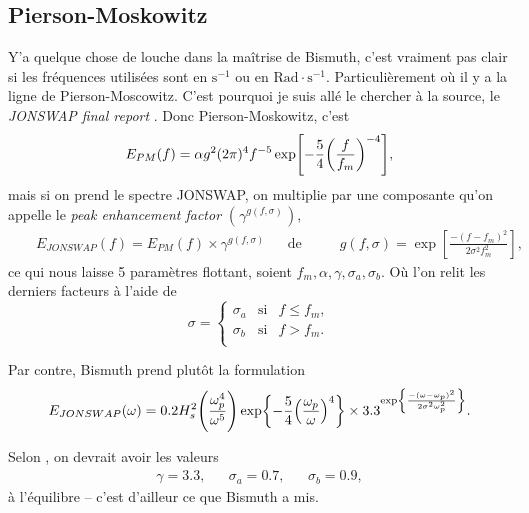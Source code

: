 \documentclass[10pt]{article}
\numberwithin{equation}{section}
\newcommand{\pt}{\hspace{1pt}} %
\begin{document}
\subsection{Pierson-Moskowitz}
\label{sec:orgaccf29c}

Y'a quelque chose de louche dans la maîtrise de Bismuth, c'est vraiment pas clair si les fréquences utilisées sont en \(\mathrm{s}^{-1}\) ou en \(\mathrm{Rad}\cdot\mathrm{s}^{-1}\).
Particulièrement où il y a la ligne de Pierson-Moscowitz.
C'est pourquoi je suis allé le chercher à la source, le \emph{JONSWAP final report} \autocite{hasselmann1973measurements}.
Donc Pierson-Moskowitz, c'est
\begin{equation}
   E_{PM}(f) = \alpha g^2 (2\pi)^4 f^{-5} \exp[- \frac{5}{4} \qty(\frac{f}{f_m})^{-4}],
\end{equation}
mais si on prend le spectre JONSWAP, on multiplie par une composante qu'on appelle le \emph{peak enhancement factor} \(\left(\pt\gamma^{g(f,\sigma)}\pt\right)\),
\begin{align}
   && E_{JONSWAP}(f) = E_{PM}(f)\times\gamma^{g(f,\sigma)}
   && \text{de sorte que} 
   && g(f,\sigma) = \exp[ \frac{-(f-f_m)^2}{2\sigma^2f_m^2}], &&
\end{align}
ce qui nous laisse 5 paramètres flottant, soient \(f_m, \alpha, \gamma, \sigma_a, \sigma_b\).
Où l'on relit les derniers facteurs à l'aide de
\begin{equation}
   \sigma = \left\lbrace\begin{matrix}
       \sigma_a & \mathrm{si} & f \leq f_m,\\
       \sigma_b & \mathrm{si} & f > f_m.\\
   \end{matrix}
  \right.
\end{equation}

Par contre, Bismuth prend plutôt la formulation
\begin{equation}
   E_{JONSWAP}(\omega) = 0.2H_s^2 \qty(\frac{\omega_p^4}{\omega^5}) \exp{-\frac{5}{4}\qty(\frac{\omega_p}{\omega})^4} \times 3.3^{\exp{\frac{-(\omega-\omega_p)^2}{2\sigma^2 \omega_p^2}}}.
\end{equation}

Selon \Textcite{hasselmann1973measurements}, on devrait avoir les valeurs
\begin{align}
   &&\gamma = 3.3, && \sigma_a = 0.7, && \sigma_b = 0.9, &&
\end{align}
à l'équilibre -- c'est d'ailleur ce que Bismuth a mis.\bigskip
\end{document}
